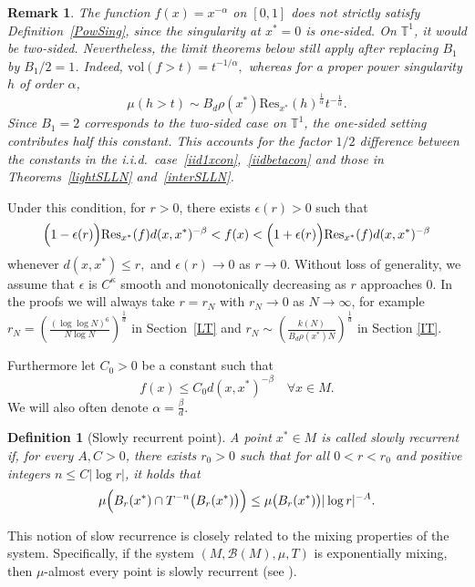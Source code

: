 \documentclass[11pt,twoside,a4paper,reqno]{amsart}
\newtheorem{definition}[theorem]{Definition}
\newtheorem{remark}[theorem]{Remark}
\begin{document}
\begin{remark}
The function $f(x)=x^{-\alpha}$ on $[0,1]$ does not strictly satisfy Definition~\ref{PowSing}, since the singularity at $x^*=0$ is one-sided. On $\mathbb{T}^1$, it would be two-sided. Nevertheless, the limit theorems below still apply after replacing $B_1$ by $B_1/2=1$. Indeed, $\mathrm{vol}(f>t)=t^{-1/\alpha},$
whereas for a proper power singularity $h$ of order $\alpha$,
$$
\mu(h>t) \sim B_d \rho(x^*) \mathrm{Res}_{x^*}(h)^{\frac{1}{\alpha}} t^{-\frac{1}{\alpha}}.
$$
Since $B_1=2$ corresponds to the two-sided case on $\mathbb{T}^1$, the one-sided setting contributes half this constant. This accounts for the factor $1/2$ difference between the constants in the i.i.d.\ case~\eqref{iid1xcon},~\eqref{iidbetacon} and those in Theorems~\ref{lightSLLN} and~\ref{interSLLN}.
\end{remark}







Under this condition, for $r>0$, there exists $\epsilon(r)>0$ such that
\begin{equation}\label{Estf}
\Bigl(1-\epsilon(r)\Bigr)\mathrm{Res}_{x^*}(f)d(x,x^*)^{-\beta}<f(x)<
\Bigl(1+\epsilon(r)\Bigr)\mathrm{Res}_{x^*}(f)d(x,x^*)^{-\beta}
\end{equation}
whenever $d(x,x^*)\leq r,$ and $\epsilon(r)\rightarrow0$ as $r\rightarrow0$. Without loss of generality, we assume that $\epsilon$ is $C^{\kappa}$ smooth and monotonically decreasing as $r$ approaches $0$. In the proofs we will always take $r = r_N$ with $r_N \to 0$ as $N \to \infty$, for example $r_N =\left(\frac{(\log \log N)^6}{N \log N}\right)^{\frac{1}{d}}$ in Section~\ref{LT} and $r_N\sim\left(\frac{k(N)}{B_d \rho(x^*) N}\right)^{\frac{1}{d}}$ in Section \ref{IT}.



Furthermore let $C_0 > 0$ be a constant such that
\begin{equation}\label{DeCf}
f(x) \leq C_0 d(x, x^*)^{-\beta} \quad \forall x\in M.
\end{equation}
We will also often denote $\alpha=\frac{\beta}{d}$.

\begin{definition}[Slowly recurrent point]\label{SlowRec}
A point $x^*\in M$ is called slowly recurrent if, for every $A, C>0$, there exists $r_0>0$ such that for all $0<r<r_0$ and positive integers $n\leq C |\log r|$, it holds that
\begin{equation*}
\mu \Bigl( B_r(x^*) \cap T^{-n}\bigl(B_r(x^*)\bigr) \Bigr) \leq \mu\bigl(B_r(x^*)\bigr) |\log r|^{-A}.
\end{equation*}
\end{definition}
This notion of slow recurrence is closely related to the mixing properties of the system. Specifically, if the system $(M, \mathcal{B}(M),\mu,T)$ is exponentially mixing, then $\mu$-almost every point is slowly recurrent (see \cite[Lemma 4.14]{DFL22}).
\end{document}
